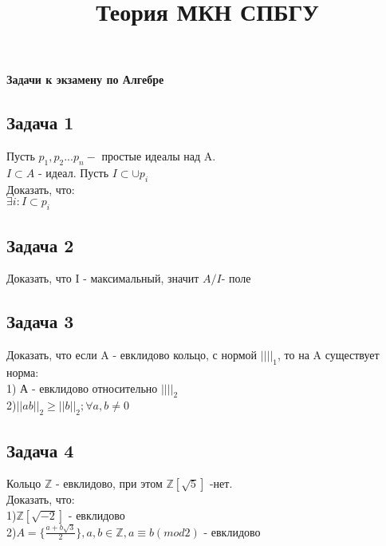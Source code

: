 \documentclass{article}
\title{Теория МКН СПБГУ}
\begin{document}
\begin{titlepage}
\begin{center}
{\LARGE \textbf{Задачи к экзамену по Алгебре}}
\end{center}
\begin{figure}[h]
\centering
\end{figure}
\end{titlepage}
\subsection*{Задача 1}
Пусть $p_1,p_2...p_n - $ простые идеалы над A.\\
$I\subset A$ - идеал. Пусть $I \subset \cup p_i$\\
Доказать, что:\\
$\exists i: I \subset p_i$
\subsection*{Задача 2}
Доказать, что I - максимальный, значит $A/I$- поле
\subsection*{Задача 3}
Доказать, что если A - евклидово кольцо, с нормой $|| ||_1$, то на A существует норма:\\
1) А - евклидово относительно $|| ||_2$\\
2)$||ab||_2\geq||b||_2; \forall a,b \neq 0$
\subsection*{Задача 4}
Кольцо $\mathbb{Z}$ - евклидово, при этом $\mathbb{Z}[\sqrt{5}]$ -нет.\\
Доказать, что:\\
1)$\mathbb{Z}[\sqrt{-2}]$ - евклидово\\
2)$A = \lbrace \frac{a+b\sqrt{3}}{2}\rbrace, a,b \in \mathbb{Z}, a\equiv b (mod 2)$ - евклидово
\end{document}
